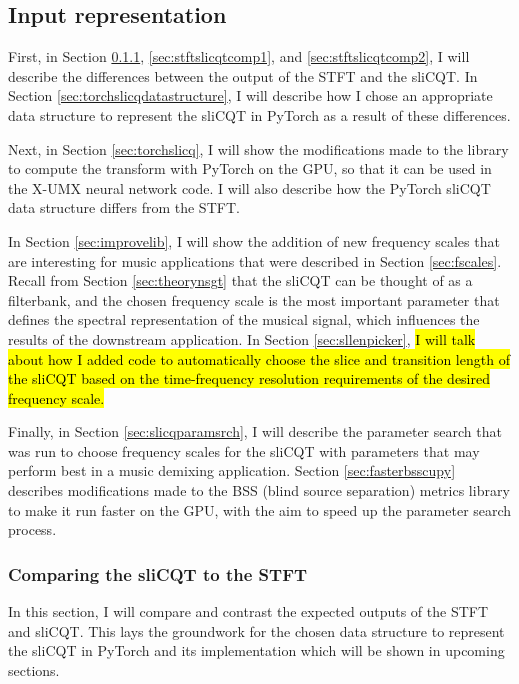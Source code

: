 \documentclass[report.tex]{subfiles}
\begin{document}
\subsection{Input representation}
\label{sec:inputrepresentation}

First, in Section \ref{sec:stftslicqtcomp}, \ref{sec:stftslicqtcomp1}, and \ref{sec:stftslicqtcomp2}, I will describe the differences between the output of the STFT and the sliCQT. In Section \ref{sec:torchslicqdatastructure}, I will describe how I chose an appropriate data structure to represent the sliCQT in PyTorch as a result of these differences.

Next, in Section \ref{sec:torchslicq}, I will show the modifications made to the library to compute the transform with PyTorch on the GPU, so that it can be used in the X-UMX neural network code. I will also describe how the PyTorch sliCQT data structure differs from the STFT.

In Section \ref{sec:improvelib}, I will show the addition of new frequency scales that are interesting for music applications that were described in Section \ref{sec:fscales}. Recall from Section \ref{sec:theorynsgt} that the sliCQT can be thought of as a filterbank, and the chosen frequency scale is the most important parameter that defines the spectral representation of the musical signal, which influences the results of the downstream application. In Section \ref{sec:sllenpicker}, \hl{I will talk about how I added code to automatically choose the slice and transition length of the sliCQT based on the time-frequency resolution requirements of the desired frequency scale.}

Finally, in Section \ref{sec:slicqparamsrch}, I will describe the parameter search that was run to choose frequency scales for the sliCQT with parameters that may perform best in a music demixing application. Section \ref{sec:fasterbsscupy} describes modifications made to the BSS (blind source separation) metrics library to make it run faster on the GPU, with the aim to speed up the parameter search process.

\subsubsection{Comparing the sliCQT to the STFT}
\label{sec:stftslicqtcomp}

In this section, I will compare and contrast the expected outputs of the STFT and sliCQT. This lays the groundwork for the chosen data structure to represent the sliCQT in PyTorch and its implementation which will be shown in upcoming sections.
\end{document}
